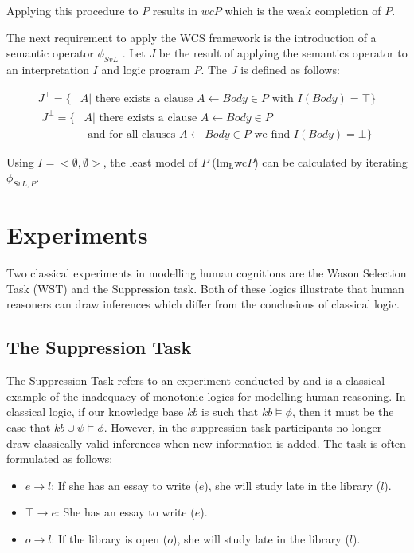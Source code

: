 \documentclass{article}
\begin{document}
Applying this procedure to $P$ results in $wcP$ which is the weak completion of $P$.

The next requirement to apply the WCS framework is the introduction of a semantic operator $\phi_{SvL}$ \citep{stenning2008interpretation}. Let $J$ be the result of applying the semantics operator to an interpretation $I$ and logic program $P$. The $J$ is defined as follows:

\[
\begin{split}
J^\top = \{ & A | \textrm{ there exists a clause } A\leftarrow Body \in P \textrm{ with } I(Body) = \top\}
\end{split}
\]
\[
\begin{split}
J^\bot = \{ &  A | \textrm{ there exists a clause } A \leftarrow Body \in P \\
           & \textrm{ and for all clauses } A \leftarrow Body \in P \textrm{ we find } I(Body) = \bot\}
\end{split}
\]

Using $I=<\emptyset, \emptyset>$, the least model of $P$ ($\textrm{lm}_\textrm{\L}$wc$P$) can be calculated by iterating $\phi_{SvL,P}$.

\section{Experiments}
Two classical experiments in modelling human cognitions are the Wason Selection Task (WST) and the Suppression task. Both of these logics illustrate that human reasoners can draw inferences which differ from the conclusions of classical logic.

\subsection{The Suppression Task} \label{ssec:sup}
The Suppression Task refers to an experiment conducted by \cite{byrne1989suppressing} and is a classical example of the inadequacy of monotonic logics for modelling human reasoning. In classical logic, if our knowledge base $kb$ is such that $kb \models \phi$, then it must be the case that $kb \cup \psi \models \phi$. However, in the suppression task participants no longer draw classically valid inferences when new information is added. The task is often formulated as follows:

\begin{itemize}
\item $e \rightarrow l$: If she has an essay to write ($e$), she will study late in the library ($l$).
\item $\top \rightarrow e$: She has an essay to write ($e$).
\item $o\rightarrow l$: If the library is open ($o$), she will study late in the library ($l$).
\end{itemize}
\end{document}
